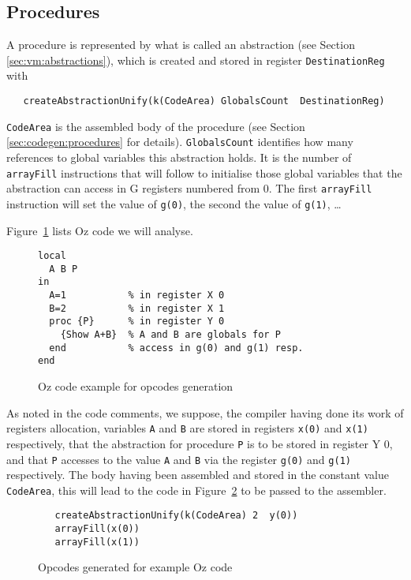 \documentclass[a4paper]{memoir}
\begin{document}
\subsection{Procedures}\label{sec:opcode:procedures}
A procedure is represented by what is called an abstraction (see Section
\ref{sec:vm:abstractions}), which is created and stored in register
\lstinline!DestinationReg! with
\begin{lstlisting}
   createAbstractionUnify(k(CodeArea) GlobalsCount  DestinationReg)
\end{lstlisting}
\lstinline!CodeArea! is the assembled body of the procedure (see Section
\ref{sec:codegen:procedures} for details). \lstinline!GlobalsCount! identifies
how many references to global variables this abstraction holds. It is the number
of \lstinline!arrayFill! instructions that will follow to initialise those global variables
that the abstraction can access in G registers numbered from 0. The first
\lstinline!arrayFill! instruction will set the value of \lstinline!g(0)!, the
second the value of \lstinline!g(1)!,
\ldots

Figure~\ref{fig:opcodes:procedures:example} lists Oz code we will analyse.

\begin{figure}[ht]
\begin{lstlisting}
local
  A B P
in
  A=1           % in register X 0
  B=2           % in register X 1
  proc {P}      % in register Y 0
    {Show A+B}  % A and B are globals for P
  end           % access in g(0) and g(1) resp.
end
\end{lstlisting}
\caption{Oz code example for opcodes generation}
\label{fig:opcodes:procedures:example}
\end{figure}


As noted in the code comments, we suppose, the compiler having done its work of
registers allocation, variables \lstinline!A! and \lstinline!B! are stored in
registers \lstinline!x(0)! and \lstinline!x(1)!
respectively, that the abstraction for procedure \lstinline!P! is to be stored in register Y
0, and that \lstinline!P! accesses to the value \lstinline!A! and \lstinline!B!
via the register \lstinline!g(0)! and \lstinline!g(1)!
respectively.
The body having been assembled and stored in the constant value
\lstinline!CodeArea!, this
will lead to the code in Figure~\ref{fig:opcodes:procedures:result} to be passed
to the assembler.
\begin{figure}[ht]
\begin{lstlisting}
   createAbstractionUnify(k(CodeArea) 2  y(0))
   arrayFill(x(0))
   arrayFill(x(1))
\end{lstlisting}
\caption{Opcodes generated for example Oz code}
\label{fig:opcodes:procedures:result}
\end{figure}
\end{document}

